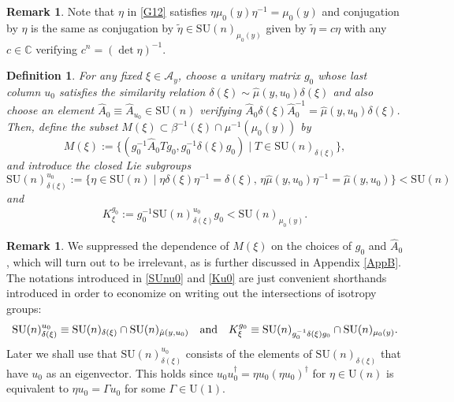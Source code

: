 \documentclass[a4paper,11pt,reqno]{amsart}
\newtheorem{defn}[thm]{Definition}
\theoremstyle{definition}
\newtheorem{rem}[thm]{Remark}
\numberwithin{equation}{section}
\newcommand{\be}{\begin{equation}}
\newcommand{\ee}{\end{equation}}
\def\cA{{\mathcal A}}                       %
\def\bC{{\mathbb C}}                        %
\def\SU{\mathrm{SU}}                        %
\def\U{\mathrm{U}}                          %
\begin{document}
\begin{rem}\label{remG5}
Note that $\eta$ in \eqref{G12} satisfies $\eta \mu_0(y) \eta^{-1} = \mu_0(y)$ and conjugation by $\eta$
is the same as conjugation by $\tilde \eta \in \SU(n)_{\mu_0(y)}$ given by
$\tilde \eta =  c \eta$ with any $c\in \bC$ verifying $c^n = (\det \eta)^{-1}$.
\end{rem}

\begin{defn}\label{defn36}
For any fixed $\xi \in \cA_y$, choose a unitary matrix $g_0$ whose last column $u_0$ satisfies the similarity relation
$\delta(\xi) \sim \hat \mu(y,u_0) \delta(\xi)$ and also choose an element $\hat A_0\equiv \hat A_{u_0}\in \SU(n)$ verifying
 $\hat A_0 \delta(\xi) \hat A_0^{-1}= \hat \mu(y,u_0) \delta(\xi)$.
 Then, define  the subset $M(\xi)  \subset \beta^{-1}(\xi)\cap \mu^{-1}(\mu_0(y))$ by
 \be
M(\xi):= \{ (g_0^{-1} \hat A_0 T g_0, g_0^{-1} \delta(\xi) g_0) \mid T \in \SU(n)_{\delta(\xi)} \},
\label{G20}\ee
and  introduce the closed Lie subgroups
\be
\SU(n)^{u_0}_{\delta(\xi)}:= \{ \eta \in \SU(n)\mid \eta \delta(\xi) \eta^{-1} = \delta(\xi),\, \eta \hat\mu(y, u_0) \eta^{-1} = \hat \mu(y, u_0)\}
< \SU(n)
\label{SUnu0}\ee
and
\be
K^{g_0}_\xi := g_0^{-1} \SU(n)^{u_0}_{\delta(\xi)} g_0 < \SU(n)_ {\mu_0(y)}.
\label{Ku0}\ee
\end{defn}


\begin{rem}
 We suppressed the dependence of $M(\xi)$ on the choices of $g_0$ and $\hat A_0$, which will turn out to be irrelevant,
 as is further discussed in Appendix \ref{AppB}.
The notations introduced in \eqref{SUnu0} and \eqref{Ku0} are just convenient shorthands introduced
in order to economize on writing out the intersections of isotropy groups:
\be
\SU(n)^{u_0}_{\delta(\xi)} \equiv \SU(n)_{\delta(\xi)} \cap \SU(n)_{\hat \mu(y,u_0)}
\quad \hbox{and}\quad
K_\xi^{g_0} \equiv \SU(n)_{g_0^{-1} \delta(\xi) g_0} \cap \SU(n)_{\mu_0(y)}.
\ee
Later we shall use that $\SU(n)^{u_0}_{\delta(\xi)}$ consists of the elements of
$\SU(n)_{\delta(\xi)}$ that have $u_0$ as an eigenvector. This holds since
$u_0 u_0^\dagger = \eta u_0 (\eta u_0)^\dagger$ for $\eta \in \U(n)$ is equivalent to $\eta u_0 =  \Gamma u_0$ for some $\Gamma \in \U(1)$.
\end{rem}
\end{document}
